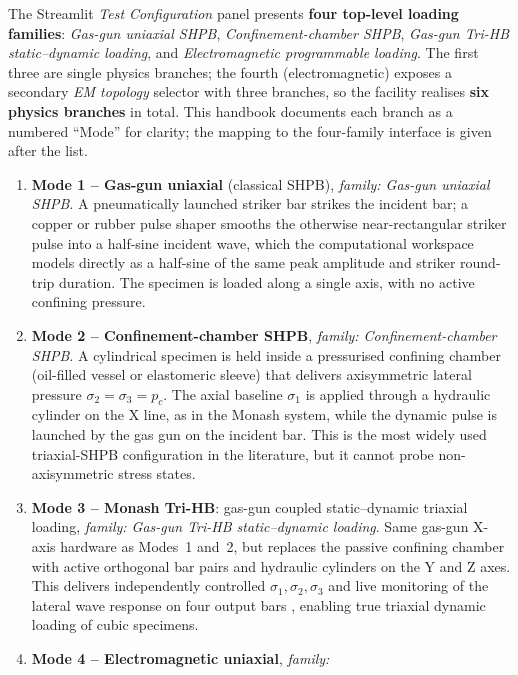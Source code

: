 \documentclass[11pt,a4paper,openany]{book}
\theoremstyle{handbook}
\newcommand{\sig}{\sigma}
\begin{document}
The Streamlit \emph{Test Configuration} panel presents \textbf{four top-level
loading families}: \emph{Gas-gun uniaxial SHPB}, \emph{Confinement-chamber
SHPB}, \emph{Gas-gun Tri-HB static--dynamic loading}, and
\emph{Electromagnetic programmable loading}. The first three are single
physics branches; the fourth (electromagnetic) exposes a secondary
\emph{EM topology} selector with three branches, so the facility realises
\textbf{six physics branches} in total. This handbook documents each branch as
a numbered ``Mode'' for clarity; the mapping to the four-family interface is
given after the list.

\begin{enumerate}[leftmargin=2.4em,itemsep=4pt]
\item \textbf{Mode 1 -- Gas-gun uniaxial} (classical SHPB), \emph{family:
      Gas-gun uniaxial SHPB}. A pneumatically
      launched striker bar strikes the incident bar; a copper or rubber pulse
      shaper smooths the otherwise near-rectangular striker pulse into a
      half-sine incident wave, which the computational workspace models directly as a
      half-sine of the same peak amplitude and striker round-trip duration.
      The specimen is loaded along a single axis, with no active confining
      pressure.
\item \textbf{Mode 2 -- Confinement-chamber SHPB}, \emph{family:
      Confinement-chamber SHPB}. A cylindrical specimen
      is held inside a pressurised confining chamber (oil-filled vessel or
      elastomeric sleeve) that delivers axisymmetric lateral pressure
      $\sig_2=\sig_3=p_c$. The axial baseline $\sig_1$ is applied through
      a hydraulic cylinder on the X line, as in the Monash system, while
      the dynamic pulse is launched by the gas gun on the incident bar.
      This is the most widely used triaxial-SHPB configuration in the
      literature, but it cannot probe non-axisymmetric stress states.
\item \textbf{Mode 3 -- Monash Tri-HB}: gas-gun coupled static--dynamic
      triaxial loading, \emph{family: Gas-gun Tri-HB static--dynamic loading}.
      Same gas-gun X-axis hardware as Modes~1 and~2, but
      replaces the passive confining chamber with active orthogonal bar
      pairs and hydraulic cylinders on the Y and Z axes. This delivers
      independently controlled $\sig_1,\sig_2,\sig_3$ and live monitoring
      of the lateral wave response on four output bars
      \cite{Liu2019,Zhang2019Tri}, enabling true triaxial dynamic loading
      of cubic specimens.
\item \textbf{Mode 4 -- Electromagnetic uniaxial}, \emph{family:
}
\end{enumerate}
\end{document}
